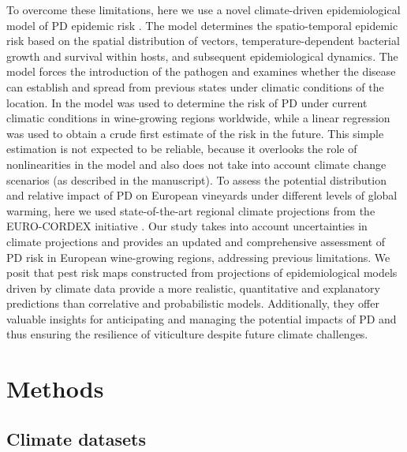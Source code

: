 To overcome these limitations, here we use a novel climate-driven
epidemiological model of PD epidemic risk \cite{GimenezRomero2022_CommsBio}.
The model
determines the spatio-temporal epidemic risk based on the spatial distribution
of vectors, temperature-dependent bacterial growth and survival within hosts,
and subsequent epidemiological dynamics. The model forces the introduction of
the pathogen and examines whether the disease can establish and spread from
previous states under climatic conditions of the location. In
\cite{GimenezRomero2022_CommsBio} the model was used to determine the risk of
PD under
current climatic conditions in wine-growing regions worldwide, while a linear
regression was used to obtain a crude first estimate of the risk in the future.
This simple estimation is not expected to be reliable, because it overlooks the
role of nonlinearities in the model and also does not take into account climate
change scenarios (as described in the manuscript). To assess the potential
distribution and relative impact of PD on European vineyards under different
levels of global warming, here we used state-of-the-art regional climate
projections from the EURO-CORDEX initiative \cite{jacob_regional_2020}. Our
study takes into account uncertainties in climate projections and provides an
updated and comprehensive assessment of PD risk in European wine-growing
regions, addressing previous limitations. We posit that pest risk maps
constructed from projections of epidemiological models driven by climate data
provide a more realistic, quantitative and explanatory predictions than
correlative and probabilistic models. Additionally, they offer valuable
insights for anticipating and managing the potential impacts of PD and thus
ensuring the resilience of viticulture despite future climate challenges.

\section{Methods}\label{methods}

\subsection{Climate datasets}

